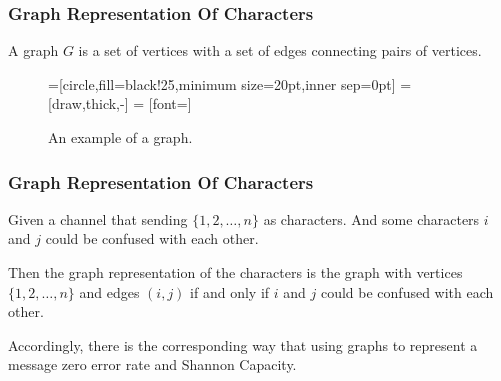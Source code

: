 \documentclass{beamer}
\begin{document}
                  \begin{frame}
                        \frametitle{Graph Representation Of Characters}
                        \begin{definition}[graph] \label{def:graph}
                              A graph $ G $ is a set of vertices with a set of edges connecting pairs of vertices.

                              \begin{figure}[h!]
                                    =[circle,fill=black!25,minimum size=20pt,inner sep=0pt]
                                     = [draw,thick,-]
                                     = [font=\small]
                                    \label{fig:graphDefinitionExample}
                                    \caption{An example of a graph.}
                              \end{figure}
                        \end{definition}
                  \end{frame}

                  \begin{frame}
                        \frametitle{Graph Representation Of Characters}
                        \begin{definition}\label{def:graphRepresetationOfChannel}
                              Given a channel that sending $\{1,2,\dots,n\}$ as characters. And some characters $i$ and $j$ could be confused with each other.

                              Then the graph representation of the characters is the graph with vertices $\{1,2,\dots,n\}$ and edges $(i,j)$ if and only if $i$ and $j$ could be confused with each other.
                        \end{definition}

                        Accordingly, there is the corresponding way that using graphs to represent a message zero error rate and Shannon Capacity.
                  \end{frame}
\end{document}
